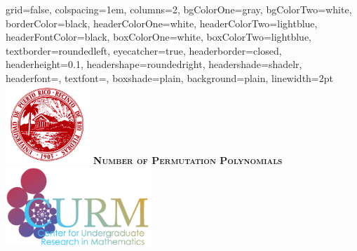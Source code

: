 \documentclass[landscape,final,paperwidth=24in,paperheight=36in]{baposter}
\begin{document}
\begin{poster}%
  {
  grid=false,
  colspacing=1em,
  columns=2,
  bgColorOne=gray,
  bgColorTwo=white,
  borderColor=black,
  headerColorOne=white,
  headerColorTwo=lightblue,
  headerFontColor=black,
  boxColorOne=white,
  boxColorTwo=lightblue,
  textborder=roundedleft,
  eyecatcher=true,
  headerborder=closed,
  headerheight=0.1\textheight,
  headershape=roundedright,
  headershade=shadelr,
  headerfont=\Large\textsc, %
  textfont=\large{\setlength{\parindent}{1.5em}},
  boxshade=plain,
  background=plain,
  linewidth=2pt
  }
  {\includegraphics[height=8em,keepaspectratio=true]{images/logo_uprrp}} 
  {\bf\textsc{Number of Permutation Polynomials}\vspace{0.1em}}
  {}
  {%
    \includegraphics[height=8em,keepaspectratio=true]{images/logo_curm}
  }

    \newcommand{\colouredcircle}{%
      \tikz{\useasboundingbox (-0.2em,-0.32em) rectangle(0.2em,0.32em); \draw[draw=black,fill=lightblue,line width=0.03em] (0,0) circle(0.18em);}}


\end{poster}
\end{document}
